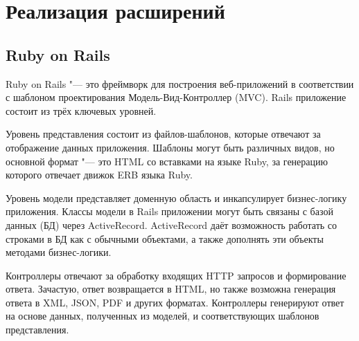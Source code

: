 \lstset{language=Ruby}

\chapter{Реализация расширений}
\label{section:implementation}

\section{Ruby on Rails}
Ruby on Rails "--- это фреймворк для построения веб-приложений в соответствии с
шаблоном проектирования Модель-Вид-Контроллер (MVC). Rails приложение состоит
из трёх ключевых уровней.

Уровень представления состоит из файлов-шаблонов, которые отвечают за
отображение данных приложения. Шаблоны могут быть различных видов, но основной
формат "--- это HTML со вставками на языке Ruby, за генерацию которого отвечает
движок ERB языка Ruby.

Уровень модели представляет доменную область и инкапсулирует бизнес-логику
приложения. Классы модели в Rails приложении могут быть связаны с базой данных
(БД) через ActiveRecord. ActiveRecord даёт возможность работать со строками в
БД как с обычными объектами, а также дополнять эти объекты методами
бизнес-логики.

Контроллеры отвечают за обработку входящих HTTP запросов и формирование ответа.
Зачастую, ответ возвращается в HTML, но также возможна генерация ответа в XML,
JSON, PDF и других форматах. Контроллеры генерируют ответ на основе данных,
полученных из моделей, и соответствующих шаблонов представления.

